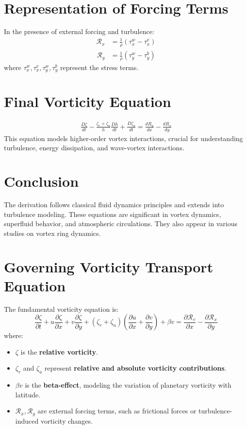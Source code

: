    \section{Representation of Forcing Terms}
    In the presence of external forcing and turbulence:
    \begin{align}
        \mathcal{R}_x &= \frac{1}{\rho}(\tau_x^w - \tau_x^v)
    \end{align}
    \begin{align}
        \mathcal{R}_y &= \frac{1}{\rho}(\tau_y^w - \tau_y^b)
    \end{align}
    where $\tau_x^w, \tau_x^v, \tau_y^w, \tau_y^b$ represent the stress terms.

    \section{Final Vorticity Equation}
    \begin{align}
        \frac{D \zeta}{d t}-\frac{\zeta_r+\zeta_a}{h} \frac{D h}{d t}+\frac{D \zeta_a}{d t}=\frac{d R_u}{d x}-\frac{d R_x}{d y}
    \end{align}
    This equation models higher-order vortex interactions, crucial for understanding turbulence, energy dissipation, and wave-vortex interactions.

    \section{Conclusion}
    The derivation follows classical fluid dynamics principles and extends into turbulence modeling. These equations are significant in vortex dynamics, superfluid behavior, and atmospheric circulations. They also appear in various studies on vortex ring dynamics.

    \section{Governing Vorticity Transport Equation}
    The fundamental vorticity equation is:
    \begin{equation}
        \frac{\partial \zeta}{\partial t} + u \frac{\partial \zeta}{\partial x} + v \frac{\partial \zeta}{\partial y} + \left( \zeta_r + \zeta_a \right) \left( \frac{\partial u}{\partial x} + \frac{\partial v}{\partial y} \right) + \beta v = \frac{\partial \mathcal{R}_v}{\partial x} - \frac{\partial \mathcal{R}_x}{\partial y}
    \end{equation}
    where:
    \begin{itemize}
        \item $\zeta$ is the \textbf{relative vorticity}.
        \item $\zeta_r$ and $\zeta_a$ represent \textbf{relative and absolute vorticity contributions}.
        \item $\beta v$ is the \textbf{beta-effect}, modeling the variation of planetary vorticity with latitude.
        \item $\mathcal{R}_x, \mathcal{R}_y$ are external forcing terms, such as frictional forces or turbulence-induced vorticity changes.
    \end{itemize}

